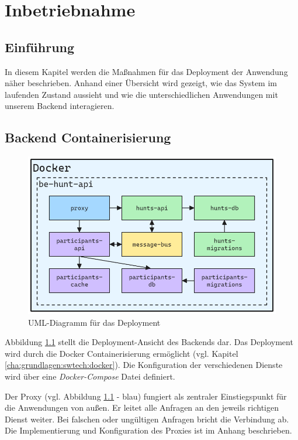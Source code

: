 \chapter{Inbetriebnahme} \label{cha:inbetriebnahme}

\section{Einführung}

In diesem Kapitel werden die Maßnahmen für das Deployment der Anwendung näher beschrieben. Anhand einer Übersicht wird gezeigt, wie das System im laufenden Zustand aussieht und wie die unterschiedlichen Anwendungen mit unserem Backend interagieren.

\section{Backend Containerisierung}

\begin{figure}[H]
  \centering
  \includegraphics[width=\textwidth]{images/PrAr_Depl_Docker.png}
  \caption{UML-Diagramm für das Deployment}
  \label{fig:deployment:docker}
\end{figure}

Abbildung \ref{fig:deployment:docker} stellt die Deployment-Ansicht des Backends dar. Das Deployment wird durch die Docker Containerisierung ermöglicht (vgl. Kapitel \ref{cha:grundlagen:swtech:docker}). Die Konfiguration der verschiedenen Dienste wird über eine \textit{Docker-Compose} Datei definiert.

Der Proxy (vgl. Abbildung \ref{fig:deployment:docker} - blau) fungiert als zentraler Einstiegspunkt für die Anwendungen von außen. Er leitet alle Anfragen an den jeweils richtigen Dienst weiter. Bei falschen oder ungültigen Anfragen bricht die Verbindung ab. Die Implementierung und Konfiguration des Proxies ist im Anhang beschrieben.

